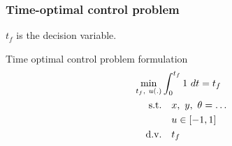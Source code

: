 \subsubsection{Time-optimal control problem}
$t_f$ is the decision variable.

\begin{problem}{{Time optimal control problem formulation}}
\begin{alignat*}{3}
\min_{t_f,~ u(.)} & \int_{0}^{t_f}  1  ~dt = t_f\\
\textnormal{s.t.} & \quad x,~ y,~ \theta = \dots\\
     & \quad u \in [-1,1]\\
\textnormal{d.v.} & \quad t_f
\end{alignat*}
\end{problem}

